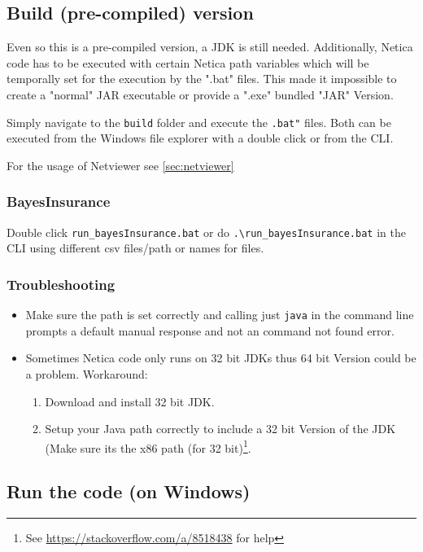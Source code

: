 \documentclass[12pt]{scrartcl}
\begin{document}
\subsection{Build (pre-compiled) version}
Even so this is a pre-compiled version, a JDK is still needed.
Additionally, Netica code has to be executed with certain Netica path variables which will be temporally set for the execution by the ".bat" files.
This made it impossible to create a "normal" JAR executable or provide a ".exe" bundled "JAR" Version.

Simply navigate to the \texttt{build} folder and execute the \texttt{.bat"} files. Both can be executed from the Windows file explorer with a double click or from the CLI.

For the usage of Netviewer see \autoref{sec:netviewer}

\subsubsection{BayesInsurance}
Double click \texttt{run_bayesInsurance.bat} or do \texttt{.\textbackslash run_bayesInsurance.bat} in the CLI using different csv files/path or names for files.

\subsubsection{Troubleshooting}
\begin{itemize}
    \item Make sure the path is set correctly and calling just \texttt{java} in the command line prompts a default manual response and not an command not found error.
    \item Sometimes Netica code only runs on 32 bit JDKs thus 64 bit Version could be a problem. Workaround:
    \begin{enumerate}
        \item Download and install 32 bit JDK.
        \item Setup your Java path correctly to include a 32 bit Version of the JDK (Make sure its the x86 path (for 32 bit)\footnote{See \url{https://stackoverflow.com/a/8518438} for help}.
    \end{enumerate}
\end{itemize}

\subsection{Run the code (on Windows)}
\end{document}
